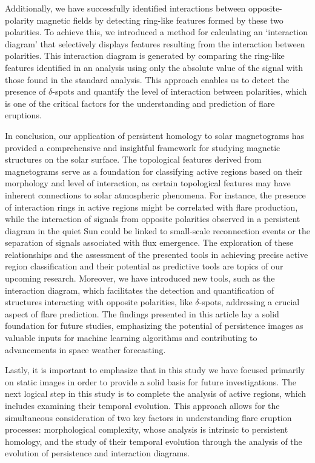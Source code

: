 Additionally, we have successfully identified interactions between opposite-polarity magnetic fields by detecting ring-like features formed by these two polarities. To achieve this, we introduced a method for calculating an `interaction diagram' that selectively displays features resulting from the interaction between polarities. This interaction diagram is generated by comparing the ring-like features identified in an analysis using only the absolute value of the signal with those found in the standard analysis. This approach enables us to detect the presence of $\delta$-spots and quantify the level of interaction between polarities, which is one of the critical factors for the understanding and prediction of flare eruptions. 

In conclusion, our application of persistent homology to solar magnetograms has provided a comprehensive and insightful framework for studying magnetic structures on the solar surface. The topological features derived from magnetograms serve as a foundation for classifying active regions based on their morphology and level of interaction, as certain topological features may have inherent connections to solar atmospheric phenomena. For instance, the presence of interaction rings in active regions might be correlated with flare production, while the interaction of signals from opposite polarities observed in a persistent diagram in the quiet Sun could be linked to small-scale reconnection events or the separation of signals associated with flux emergence. The exploration of these relationships and the assessment of the presented tools in achieving precise active region classification and their potential as predictive tools are topics of our upcoming research. Moreover, we have introduced new tools, such as the interaction diagram, which facilitates the detection and quantification of structures interacting with opposite polarities, like $\delta$-spots, addressing a crucial aspect of flare prediction. The findings presented in this article lay a solid foundation for future studies, emphasizing the potential of persistence images as valuable inputs for machine learning algorithms and contributing to advancements in space weather forecasting.

Lastly, it is important to emphasize that in this study we have focused primarily on static images in order to provide a solid basis for future investigations. The next logical step in this study is to complete the analysis of active regions, which includes examining their temporal evolution. This approach allows for the simultaneous consideration of two key factors in understanding flare eruption processes: morphological complexity, whose analysis is intrinsic to persistent homology, and the study of their temporal evolution through the analysis of the evolution of persistence and interaction diagrams.

